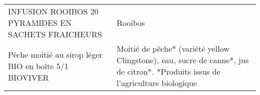 \begin{longtable}{p{5cm}p{10cm}}
                                                      INFUSION ROOIBOS 20 PYRAMIDES EN SACHETS FRAICHEURS &                                                                                                                                                                                                                                                                                                                                                                                                                                                                                                                                                                                                                                                                                                                                                                                                                                                                                                                                                                                                                                  Rooibos \\
                                                    Pêche moitié au sirop léger BIO en boîte 5/1 BIOVIVER &                                                                                                                                                                                                                                                                                                                                                                                                                                                                                                                                                                                                                                                                                                                                                                                                                                                                                                         Moitié de pêche* (variété yellow Clingstone), eau, sucre de canne*, jus de citron*.  *Produits issus de l'agriculture biologique \\

\end{longtable}

